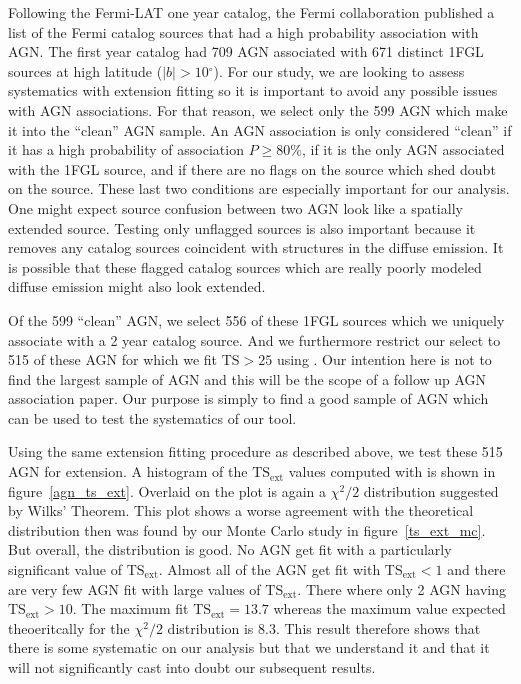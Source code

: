 \documentclass[12pt,preprint]{aastex}
\newcommand{\tsext}{{\ensuremath{\text{TS}_\text{ext}}}\xspace}
\newcommand{\ts}{\text{TS}\xspace}
\renewcommand{\deg}{\ensuremath{^\circ}\xspace}
\newcommand{\pointlike}{\text{\em pointlike}\xspace}
\begin{document}
Following the Fermi-LAT one year catalog, the Fermi collaboration
published a list of the Fermi catalog sources that had a high probability
association with AGN. The first year catalog had 709 AGN associated with
671 distinct 1FGL sources at high latitude ($|b|>10\deg$).  For our
study, we are looking to assess systematics with extension fitting so
it is important to avoid any possible issues with AGN associations.
For that reason, we select only the 599 AGN which make it into the
``clean'' AGN sample. An AGN association is only considered ``clean''
if it has a high probability of association $P\ge 80\%$, if it is the
only AGN associated with the 1FGL source, and if there are no flags
on the source which shed doubt on the source\cite{first_cat}. These last two
conditions are especially important for our analysis. One might expect
source confusion between two AGN look like a spatially extended source.
Testing only unflagged sources is also important because it removes
any catalog sources coincident with structures in the diffuse emission.
It is possible that these flagged catalog sources which are really poorly
modeled diffuse emission might also look extended.

Of the 599 ``clean'' AGN, we select 556 of these 1FGL sources which
we uniquely associate with a 2 year catalog source. And we furthermore
restrict our select to 515 of these AGN for which we fit $\ts>25$ using
\pointlike.  Our intention here is not to find the largest sample of
AGN and this will be the scope of a follow up AGN association paper. Our
purpose is simply to find a good sample of AGN which can be used to
test the systematics of our tool.

Using the same extension fitting procedure as described above, we
test these 515 AGN for extension. A histogram of the \tsext values
computed with \pointlike
is shown in figure~\ref{agn_ts_ext}. Overlaid on the plot is again a
$\chi^2/2$ distribution suggested by Wilks' Theorem.  This plot shows
a worse agreement with the theoretical distribution then was found
by our Monte Carlo study in figure~\ref{ts_ext_mc}.  But overall, the
distribution is good. No AGN get fit with a particularly significant
value of $\tsext$. Almost all of the AGN get fit with $\tsext<1$ and
there are very few AGN fit with large values of \tsext.  There where
only 2 AGN having $\tsext>10$.  The maximum fit $\tsext=13.7$ whereas the
maximum value expected theoeritcally for the $\chi^2/2$ distribution is
8.3. This result therefore shows that there is some systematic on our
analysis but that we understand it and that it will not significantly
cast into doubt our subsequent results.
\end{document}
